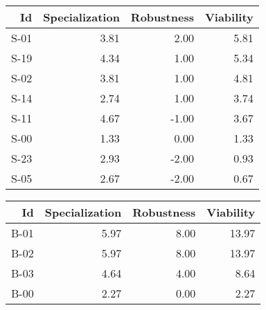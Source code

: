 


\begin{tabular}{ | r | r | r | r | }
    \hline
                    Id  &  Specialization  &      Robustness  &       Viability  \\
    \hline
    \hline
                  S-01  &            3.81  &            2.00  &            5.81  \\
    \hline
                  S-19  &            4.34  &            1.00  &            5.34  \\
    \hline
                  S-02  &            3.81  &            1.00  &            4.81  \\
    \hline
                  S-14  &            2.74  &            1.00  &            3.74  \\
    \hline
                  S-11  &            4.67  &           -1.00  &            3.67  \\
    \hline
                  S-00  &            1.33  &            0.00  &            1.33  \\
    \hline
                  S-23  &            2.93  &           -2.00  &            0.93  \\
    \hline
                  S-05  &            2.67  &           -2.00  &            0.67  \\
    \hline
\end{tabular}


\begin{tabular}{ | r | r | r | r | }
    \hline
                    Id  &  Specialization  &      Robustness  &       Viability  \\
    \hline
    \hline
                  B-01  &            5.97  &            8.00  &           13.97  \\
    \hline
                  B-02  &            5.97  &            8.00  &           13.97  \\
    \hline
                  B-03  &            4.64  &            4.00  &            8.64  \\
    \hline
                  B-00  &            2.27  &            0.00  &            2.27  \\
    \hline
\end{tabular}


